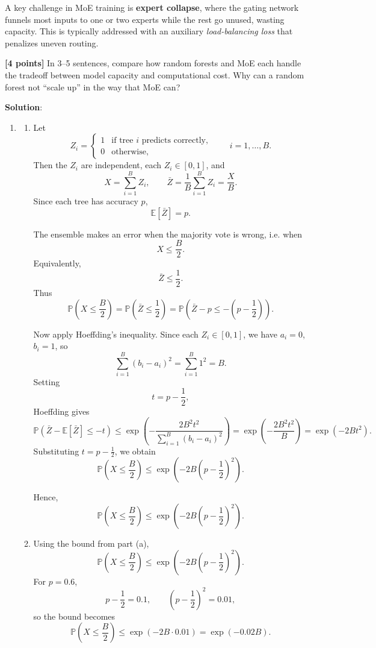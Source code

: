 \documentclass[submit]{harvardml}
\newenvironment{solution}{
    \vspace{2mm}
    \color{blue}\noindent\textbf{Solution}:
}{}
\begin{document}
\begin{problem}
\begin{enumerate}
A key challenge in MoE training is \textbf{expert collapse}, where the gating network funnels most inputs to one or two experts while the rest go unused, wasting capacity. This is typically addressed with an auxiliary \emph{load-balancing loss} that penalizes uneven routing.

\textbf{[4 points]} In 3--5 sentences, compare how random forests and MoE each handle the tradeoff between model capacity and computational cost. Why can a random forest not ``scale up'' in the way that MoE can?
\end{enumerate}

\end{problem}

\begin{solution}
	\begin{enumerate}
	    \item \begin{enumerate}
	        \item Let
\[
Z_i =
\begin{cases}
1 & \text{if tree } i \text{ predicts correctly},\\
0 & \text{otherwise},
\end{cases}
\qquad i=1,\dots,B.
\]
Then the \(Z_i\) are independent, each \(Z_i \in [0,1]\), and
\[
X=\sum_{i=1}^B Z_i,
\qquad
\bar Z = \frac{1}{B}\sum_{i=1}^B Z_i = \frac{X}{B}.
\]
Since each tree has accuracy \(p\),
\[
\mathbb{E}[\bar Z]=p.
\]

The ensemble makes an error when the majority vote is wrong, i.e. when
\[
X \le \frac{B}{2}.
\]
Equivalently,
\[
\bar Z \le \frac{1}{2}.
\]
Thus
\[
\mathbb{P}\!\left(X \le \frac{B}{2}\right)
=
\mathbb{P}\!\left(\bar Z \le \frac{1}{2}\right)
=
\mathbb{P}\!\left(\bar Z - p \le -\left(p-\frac{1}{2}\right)\right).
\]

Now apply Hoeffding’s inequality. Since each \(Z_i \in [0,1]\), we have \(a_i=0\), \(b_i=1\), so
\[
\sum_{i=1}^B (b_i-a_i)^2 = \sum_{i=1}^B 1^2 = B.
\]
Setting
\[
t = p-\frac{1}{2},
\]
Hoeffding gives
\[
\mathbb{P}\!\left(\bar Z - \mathbb{E}[\bar Z] \le -t\right)
\le
\exp\!\left(-\frac{2B^2 t^2}{\sum_{i=1}^B (b_i-a_i)^2}\right)
=
\exp\!\left(-\frac{2B^2 t^2}{B}\right)
=
\exp(-2Bt^2).
\]
Substituting \(t=p-\tfrac12\), we obtain
\[
\mathbb{P}\!\left(X \le \frac{B}{2}\right)
\le
\exp\!\left(-2B\left(p-\frac12\right)^2\right).
\]

Hence,
\[
\boxed{
\mathbb{P}\!\left(X \le \frac{B}{2}\right)
\le
\exp\!\left(-2B\left(p-\frac12\right)^2\right)
}.
\]
            \item Using the bound from part (a),
\[
\mathbb{P}\!\left(X \le \frac{B}{2}\right)
\le
\exp\!\left(-2B\left(p-\frac12\right)^2\right).
\]
For \(p=0.6\),
\[
p-\frac12 = 0.1,
\qquad
\left(p-\frac12\right)^2 = 0.01,
\]
so the bound becomes
\[
\mathbb{P}\!\left(X \le \frac{B}{2}\right)
\le
\exp(-2B\cdot 0.01)
=
\exp(-0.02B).
\]


\end{enumerate}
\end{enumerate}
\end{solution}
\end{document}
